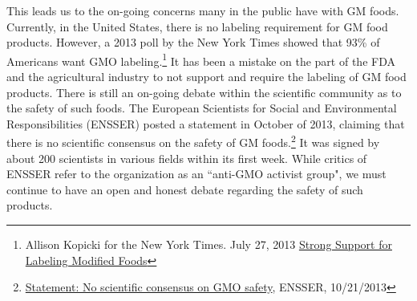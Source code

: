 \documentclass[letterpaper,10pt,twoside]{article}
\begin{document}
This leads us to the on-going concerns many in the public have with GM foods.  Currently, in the United States, there is no labeling requirement for GM food products.  However, a 2013 poll by the New York Times showed that 93\% of Americans want GMO labeling.\footnote{Allison Kopicki for the New York Times. July 27, 2013 \href{http://www.nytimes.com/2013/07/28/science/strong-support-for-labeling-modified-foods.html?_r=0}{Strong Support for Labeling Modified Foods}}  It has been a mistake on the part of the FDA and the agricultural industry to not support and require the labeling of GM food products.  There is still an on-going debate within the scientific community as to the safety of such foods.  The European Scientists for Social and Environmental Responsibilities (ENSSER) posted a statement in October of 2013, claiming that there is no scientific consensus on the safety of GM foods.\footnote{\href{http://www.ensser.org/increasing-public-information/no-scientific-consensus-on-gmo-safety/}{Statement: No scientific consensus on GMO safety}, ENSSER, 10/21/2013}  It was signed by about 200 scientists in various fields within its first week.  While critics of ENSSER refer to the organization as an ``anti-GMO activist group", we must continue to have an open and honest debate regarding the safety of such products.
\end{document}
